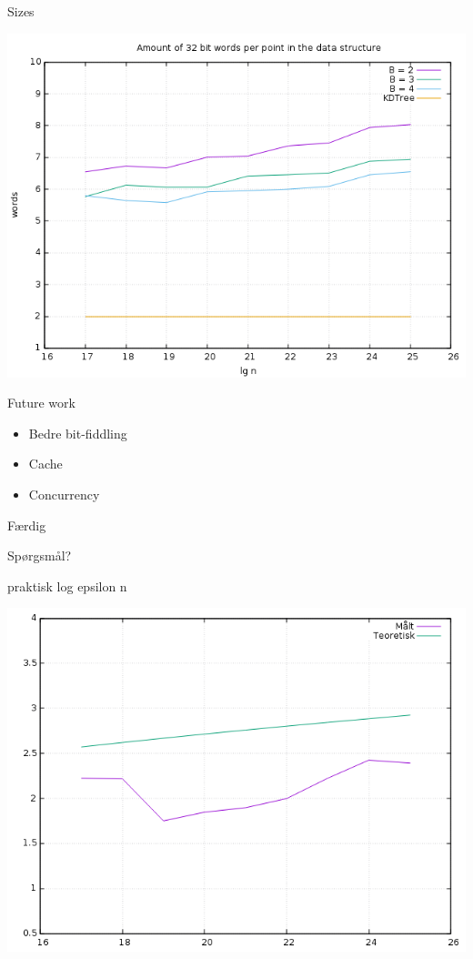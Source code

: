 \documentclass[pdf]{beamer}
\begin{document}
\begin{frame}{Sizes}
  \begin{center}
    \includegraphics[scale=0.35]{pictures/analysis/sizes.png}
  \end{center}
\end{frame}

\begin{frame}{Future work}
  \begin{itemize}
    \item Bedre bit-fiddling
    \item Cache
    \item Concurrency
  \end{itemize}
\end{frame}

\begin{frame}{Færdig}
  \begin{center}
    Spørgsmål?
  \end{center}
\end{frame}


\begin{frame}{praktisk log epsilon n}
  \begin{center}
    \includegraphics[scale=0.35]{pictures/theory_vs_actual.png}
  \end{center}
\end{frame}
\end{document}
